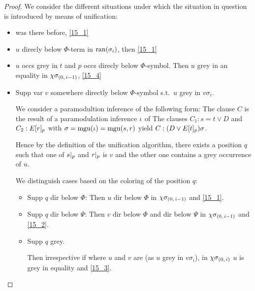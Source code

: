\documentclass[,%
	draft=false,%
	numbers=noendperiod
	12pt,
	a4paper,
	oneside,%
	openany,
]{memoir}
\newcommand{\inv}{\ensuremath{\chi}}
\begin{document}
\begin{proof}
	We consider the different situations under which the situation in question is introduced by means of unification: 
	\begin{itemize}
		\item
			was there before, \ref{15_1}

		\item
			$u$ direcly below $\Phi$-term in $\operatorname{ran}(\sigma_i)$, then \ref{15_1}

		\item
			$u$ occs grey in $t$ and $p$ occs direcly below $\Phi$-symbol.
			Then $u$ grey in an equality in $\inv\sigmazmi$, \ref{15_4}

		\item
			Supp var $v$ somewhere directly below $\Phi$-symbol s.t.\ $u$ grey in $v\sigma_i$.

			We consider a paramodultion inference of the following form:
			The clause $C$ is the result of a paramodulation inference\nolinebreak{} $\iota$ of
			The clauses $C_1: s=t \lor D$ and $C_2: E{[r]_{p}}$ with $\sigma=\operatorname{mgu}(\iota)=\operatorname{mgu}(s, r)$ yield $C: (D\lor E{[t]_{p}})\sigma$.

			Hence by the definition of the unification algorithm, there exists a position $q$ such that one of $s|_{p}$ and $r|_{p}$ is $v$ and the other one contains a grey occurrence of $u$.

			We distinguish cases based on the coloring of the position $q$:

			\begin{itemize}
				\item Supp $q$ dir below $\Phi$: Then $u$ dir below $\Phi$ in $\inv\sigmazmi$ and \ref{15_1}.
				\item Supp $q$ dir below $\Psi$: Then $v$ dir below $\Phi$ and dir below $\Psi$ in $\inv\sigmazmi$ and \ref{15_2}.
				\item Supp $q$ grey.

					Then irrespective if where $u$ and $v$ are (as $u$ grey in $v\sigma_i$), in $\inv\sigmazi$ $u$ is grey in equality and \ref{15_3}.
			\end{itemize}



	\end{itemize}
\end{proof}
\cbend
\end{document}

